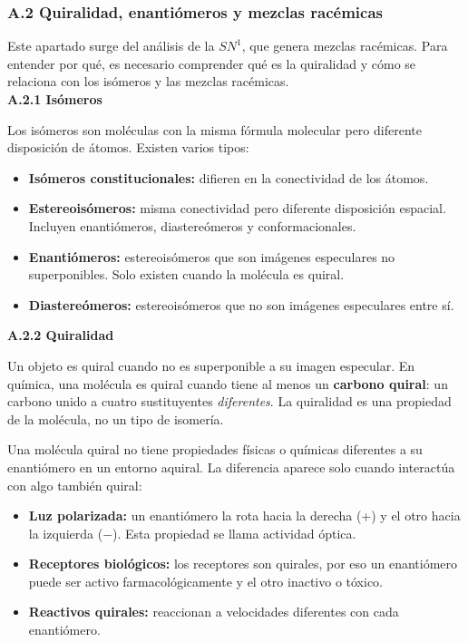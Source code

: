 
\label{sec:anexo:quiralidad}
\subsubsection*{\textcolor{blueunam}{A.2 Quiralidad, enantiómeros y mezclas racémicas}}

Este apartado surge del análisis de la $SN^1$, que genera mezclas racémicas. Para entender
por qué, es necesario comprender qué es la quiralidad y cómo se relaciona con los isómeros
y las mezclas racémicas. \\

\label{sec:anexo:quiralidad:isomeros}
\textbf{A.2.1 Isómeros}

Los isómeros son moléculas con la misma fórmula molecular pero diferente disposición de átomos.
Existen varios tipos:

\begin{itemize}
\item \textbf{Isómeros constitucionales:} difieren en la conectividad de los átomos.
\item \textbf{Estereoisómeros:} misma conectividad pero diferente disposición espacial.
Incluyen enantiómeros, diastereómeros y conformacionales.
\item \textbf{Enantiómeros:} estereoisómeros que son imágenes especulares no superponibles.
Solo existen cuando la molécula es quiral.
\item \textbf{Diastereómeros:} estereoisómeros que no son imágenes especulares entre sí.
\end{itemize}

\label{sec:anexo:quiralidad:quiral}
\textbf{A.2.2 Quiralidad}

Un objeto es quiral cuando no es superponible a su imagen especular. En química, una molécula es
quiral cuando tiene al menos un \textbf{carbono quiral}: un carbono unido a cuatro sustituyentes
\textit{diferentes}. La quiralidad es una propiedad de la molécula, no un tipo de isomería.

Una molécula quiral no tiene propiedades físicas o químicas diferentes a su enantiómero en un
entorno aquiral. La diferencia aparece solo cuando interactúa con algo también quiral:

\begin{itemize}
\item \textbf{Luz polarizada:} un enantiómero la rota hacia la derecha (+) y el otro hacia la
izquierda ($-$). Esta propiedad se llama actividad óptica.
\item \textbf{Receptores biológicos:} los receptores son quirales, por eso un enantiómero puede
ser activo farmacológicamente y el otro inactivo o tóxico.
\item \textbf{Reactivos quirales:} reaccionan a velocidades diferentes con cada enantiómero.
\end{itemize}

